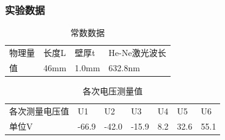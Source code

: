 \documentclass{ctexart}
\begin{document}
      \subsubsection{实验数据}
\begin{table}[htbp]
  \centering
  \caption{常数数据}
  
    \begin{tabular}{llll}
    物理量   & 长度L   & 壁厚t   & He-Ne激光波长 \\
    值     & 46mm  & 1.0mm & 632.8nm \\
    \end{tabular}%

  \label{tab:addlabel}%
\end{table}%
\begin{table}[htbp]
  \centering
  \caption{各次电压测量值}
  
    \begin{tabular}{lrrrrrr}
    各次测量电压值 & \multicolumn{1}{l}{U1} & \multicolumn{1}{l}{U2} & \multicolumn{1}{l}{U3} & \multicolumn{1}{l}{U4} & \multicolumn{1}{l}{U5} & \multicolumn{1}{l}{U6} \\
    单位V   & -66.9 & -42.0   & -15.9 & 8.2   & 32.6  & 55.1 \\
    \end{tabular}%
  
  \label{tab:addlabel}%
\end{table}%
\end{document}
